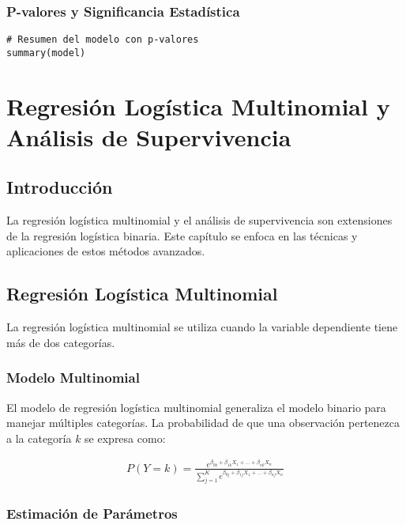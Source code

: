 \documentclass[a4paper]{report} %
\begin{document}
\subsection{P-valores y Significancia Estad\'istica}

\begin{verbatim}
# Resumen del modelo con p-valores
summary(model)
\end{verbatim}



\chapter{Regresi\'on Log\'istica Multinomial y An\'alisis de Supervivencia}

\section{Introducci\'on}

La regresi\'on log\'istica multinomial y el an\'alisis de supervivencia son extensiones de la regresi\'on log\'istica binaria. Este cap\'itulo se enfoca en las t\'ecnicas y aplicaciones de estos m\'etodos avanzados.

\section{Regresi\'on Log\'istica Multinomial}

La regresi\'on log\'istica multinomial se utiliza cuando la variable dependiente tiene m\'as de dos categor\'ias.

\subsection{Modelo Multinomial}

El modelo de regresi\'on log\'istica multinomial generaliza el modelo binario para manejar m\'ultiples categor\'ias. La probabilidad de que una observaci\'on pertenezca a la categor\'ia $k$ se expresa como:

\begin{eqnarray*}
P(Y = k) = \frac{e^{\beta_{0k} + \beta_{1k} X_1 + \ldots + \beta_{nk} X_n}}{\sum_{j=1}^{K} e^{\beta_{0j} + \beta_{1j} X_1 + \ldots + \beta_{nj} X_n}}
\end{eqnarray*}

\subsection{Estimaci\'on de Par\'ametros}
\end{document}
